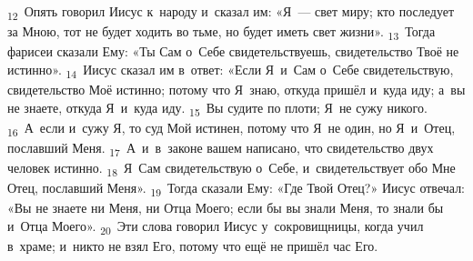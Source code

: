 \documentclass[a4paper,12pt]{article}
\begin{document}
\textsubscript{12}~Опять говорил Иисус к~народу и~сказал им: «Я~--- свет миру; кто последует за Мною, тот не будет ходить во тьме, но будет иметь свет жизни».
\textsubscript{13}~Тогда фарисеи сказали Ему: «Ты Сам о~Себе свидетельствуешь, свидетельство Твоё не истинно».
\textsubscript{14}~Иисус сказал им в~ответ: «Если Я~и~Сам о~Себе свидетельствую, свидетельство Моё истинно; потому что Я~знаю, откуда пришёл и~куда иду; а~вы не знаете, откуда Я~и~куда иду.
\textsubscript{15}~Вы судите по плоти; Я~не сужу никого.
\textsubscript{16}~А~если и~сужу Я, то суд Мой истинен, потому что Я~не один, но Я~и~Отец, пославший Меня.
\textsubscript{17}~А~и~в~законе вашем написано, что свидетельство двух человек истинно.
\textsubscript{18}~Я~Сам свидетельствую о~Себе, и~свидетельствует обо Мне Отец, пославший Меня».
\textsubscript{19}~Тогда сказали Ему: «Где Твой Отец?» Иисус отвечал: «Вы не знаете ни Меня, ни Отца Моего; если бы вы знали Меня, то знали бы и~Отца Моего».
\textsubscript{20}~Эти слова говорил Иисус у~сокровищницы, когда учил в~храме; и~никто не взял Его, потому что ещё не пришёл час Его.
\end{document}
